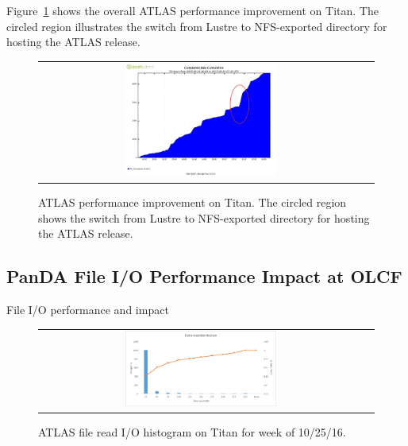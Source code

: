 Figure~\ref{fig:atlas-perf-improvement} shows the overall ATLAS performance
improvement on Titan. The circled region illustrates the switch from Lustre to
NFS-exported directory for hosting the ATLAS release.

\begin{figure}[!htb]
    \centering
    \begin{tabular}{cc}
        {\includegraphics[width=0.48\textwidth]{figures/panda-completed-jobs-sw-move.pdf}}\\
    \end{tabular}
    \caption{ATLAS performance improvement on Titan. The circled region shows the switch from Lustre to NFS-exported directory for hosting the ATLAS release.}
    \label{fig:atlas-perf-improvement}
\end{figure}



\subsection{PanDA File I/O Performance Impact at OLCF}

File I/O performance and impact


\begin{figure}[!htb]
    \centering
    \begin{tabular}{cc}
        {\includegraphics[width=0.48\textwidth]{figures/panda_data_read_hist.pdf}}\\
    \end{tabular}
    \caption{ATLAS file read I/O histogram on Titan for week of 10/25/16.}
    \label{fig:atlas-titan-io-read}
\end{figure}



